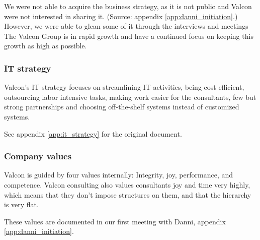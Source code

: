 We were not able to acquire the business strategy, as it is not public and Valcon were not interested in sharing it. (Source: appendix \ref{app:danni_initiation}.)
However, we were able to glean some of it through the interviews and meetings
The Valcon Group is in rapid growth and have a continued focus on keeping this growth as high as possible.

\subsubsection{IT strategy}
Valcon's IT strategy focuses on streamlining IT activities, being cost efficient, outsourcing labor intensive tasks, making work easier for the consultants, few but strong partnerships and choosing off-the-shelf systems instead of customized systems.

See appendix \ref{app:it_strategy} for the original document.

\subsubsection{Company values}
Valcon is guided by four values internally: Integrity, joy, performance, and competence.
Valcon consulting also values consultants joy and time very highly, which means that they don't impose structures on them, and that the hierarchy is very flat.

These values are documented in our first meeting with Danni, appendix \ref{app:danni_initiation}.
